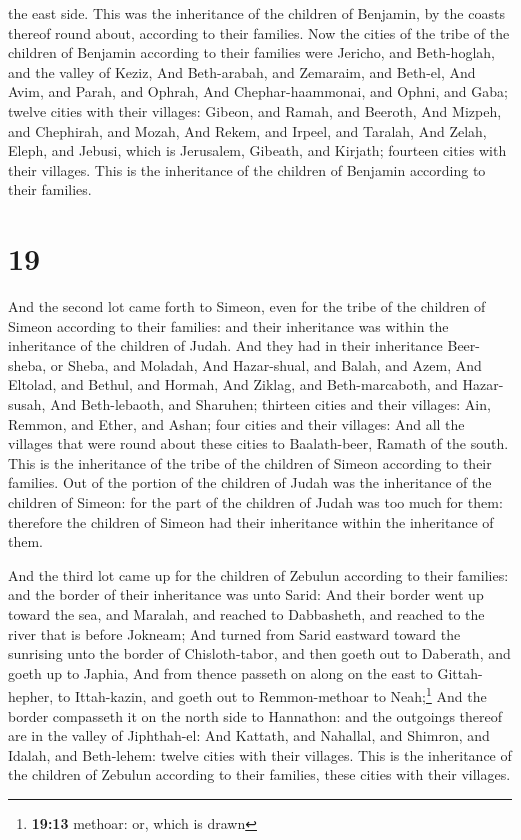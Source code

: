 the east side. This was the inheritance of the children of Benjamin, by
the coasts thereof round about, according to their families.
 Now the cities of the tribe of the children of Benjamin
according to their families were Jericho, and Beth-hoglah, and the
valley of Keziz,  And Beth-arabah, and Zemaraim, and
Beth-el,  And Avim, and Parah, and Ophrah,
 And Chephar-haammonai, and Ophni, and Gaba; twelve
cities with their villages:  Gibeon, and Ramah, and
Beeroth,  And Mizpeh, and Chephirah, and Mozah,
 And Rekem, and Irpeel, and Taralah,  And
Zelah, Eleph, and Jebusi, which is Jerusalem, Gibeath, and Kirjath;
fourteen cities with their villages. This is the inheritance of the
children of Benjamin according to their families.

\hypertarget{section-18}{%
\section{19}\label{section-18}}

 And the second lot came forth to Simeon, even for the
tribe of the children of Simeon according to their families: and their
inheritance was within the inheritance of the children of Judah.
 And they had in their inheritance Beer-sheba, or Sheba,
and Moladah,  And Hazar-shual, and Balah, and Azem,
 And Eltolad, and Bethul, and Hormah,  And
Ziklag, and Beth-marcaboth, and Hazar-susah,  And
Beth-lebaoth, and Sharuhen; thirteen cities and their villages:
 Ain, Remmon, and Ether, and Ashan; four cities and their
villages:  And all the villages that were round about
these cities to Baalath-beer, Ramath of the south. This is the
inheritance of the tribe of the children of Simeon according to their
families.  Out of the portion of the children of Judah was
the inheritance of the children of Simeon: for the part of the children
of Judah was too much for them: therefore the children of Simeon had
their inheritance within the inheritance of them.

 And the third lot came up for the children of Zebulun
according to their families: and the border of their inheritance was
unto Sarid:  And their border went up toward the sea, and
Maralah, and reached to Dabbasheth, and reached to the river that is
before Jokneam;  And turned from Sarid eastward toward
the sunrising unto the border of Chisloth-tabor, and then goeth out to
Daberath, and goeth up to Japhia,  And from thence
passeth on along on the east to Gittah-hepher, to Ittah-kazin, and goeth
out to Remmon-methoar to Neah;\footnote{\textbf{19:13} methoar: or,
  which is drawn}  And the border compasseth it on the
north side to Hannathon: and the outgoings thereof are in the valley of
Jiphthah-el:  And Kattath, and Nahallal, and Shimron, and
Idalah, and Beth-lehem: twelve cities with their villages.
 This is the inheritance of the children of Zebulun
according to their families, these cities with their villages.

